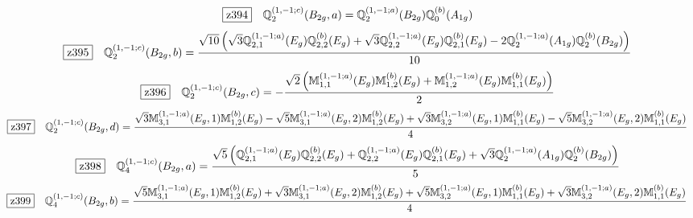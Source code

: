\documentclass[fleqn,10pt,landscape]{jsarticle}
\begin{document}
\begin{dmath*}
\hspace*{3mm}\fbox{z394}\quad \mathbb{Q}_{2}^{(1,-1;c)}(B_{2g},a)=\mathbb{Q}_{2}^{(1,-1;a)}(B_{2g}) \mathbb{Q}_{0}^{(b)}(A_{1g})
\end{dmath*}
\begin{dmath*}
\hspace*{3mm}\fbox{z395}\quad \mathbb{Q}_{2}^{(1,-1;c)}(B_{2g},b)=\frac{\sqrt{10} \left(\sqrt{3} \mathbb{Q}_{2,1}^{(1,-1;a)}(E_{g}) \mathbb{Q}_{2,2}^{(b)}(E_{g}) + \sqrt{3} \mathbb{Q}_{2,2}^{(1,-1;a)}(E_{g}) \mathbb{Q}_{2,1}^{(b)}(E_{g}) - 2 \mathbb{Q}_{2}^{(1,-1;a)}(A_{1g}) \mathbb{Q}_{2}^{(b)}(B_{2g})\right)}{10}
\end{dmath*}
\begin{dmath*}
\hspace*{3mm}\fbox{z396}\quad \mathbb{Q}_{2}^{(1,-1;c)}(B_{2g},c)=- \frac{\sqrt{2} \left(\mathbb{M}_{1,1}^{(1,-1;a)}(E_{g}) \mathbb{M}_{1,2}^{(b)}(E_{g}) + \mathbb{M}_{1,2}^{(1,-1;a)}(E_{g}) \mathbb{M}_{1,1}^{(b)}(E_{g})\right)}{2}
\end{dmath*}
\begin{dmath*}
\hspace*{3mm}\fbox{z397}\quad \mathbb{Q}_{2}^{(1,-1;c)}(B_{2g},d)=\frac{\sqrt{3} \mathbb{M}_{3,1}^{(1,-1;a)}(E_{g},1) \mathbb{M}_{1,2}^{(b)}(E_{g}) - \sqrt{5} \mathbb{M}_{3,1}^{(1,-1;a)}(E_{g},2) \mathbb{M}_{1,2}^{(b)}(E_{g}) + \sqrt{3} \mathbb{M}_{3,2}^{(1,-1;a)}(E_{g},1) \mathbb{M}_{1,1}^{(b)}(E_{g}) - \sqrt{5} \mathbb{M}_{3,2}^{(1,-1;a)}(E_{g},2) \mathbb{M}_{1,1}^{(b)}(E_{g})}{4}
\end{dmath*}
\begin{dmath*}
\hspace*{3mm}\fbox{z398}\quad \mathbb{Q}_{4}^{(1,-1;c)}(B_{2g},a)=\frac{\sqrt{5} \left(\mathbb{Q}_{2,1}^{(1,-1;a)}(E_{g}) \mathbb{Q}_{2,2}^{(b)}(E_{g}) + \mathbb{Q}_{2,2}^{(1,-1;a)}(E_{g}) \mathbb{Q}_{2,1}^{(b)}(E_{g}) + \sqrt{3} \mathbb{Q}_{2}^{(1,-1;a)}(A_{1g}) \mathbb{Q}_{2}^{(b)}(B_{2g})\right)}{5}
\end{dmath*}
\begin{dmath*}
\hspace*{3mm}\fbox{z399}\quad \mathbb{Q}_{4}^{(1,-1;c)}(B_{2g},b)=\frac{\sqrt{5} \mathbb{M}_{3,1}^{(1,-1;a)}(E_{g},1) \mathbb{M}_{1,2}^{(b)}(E_{g}) + \sqrt{3} \mathbb{M}_{3,1}^{(1,-1;a)}(E_{g},2) \mathbb{M}_{1,2}^{(b)}(E_{g}) + \sqrt{5} \mathbb{M}_{3,2}^{(1,-1;a)}(E_{g},1) \mathbb{M}_{1,1}^{(b)}(E_{g}) + \sqrt{3} \mathbb{M}_{3,2}^{(1,-1;a)}(E_{g},2) \mathbb{M}_{1,1}^{(b)}(E_{g})}{4}
\end{dmath*}
\end{document}
